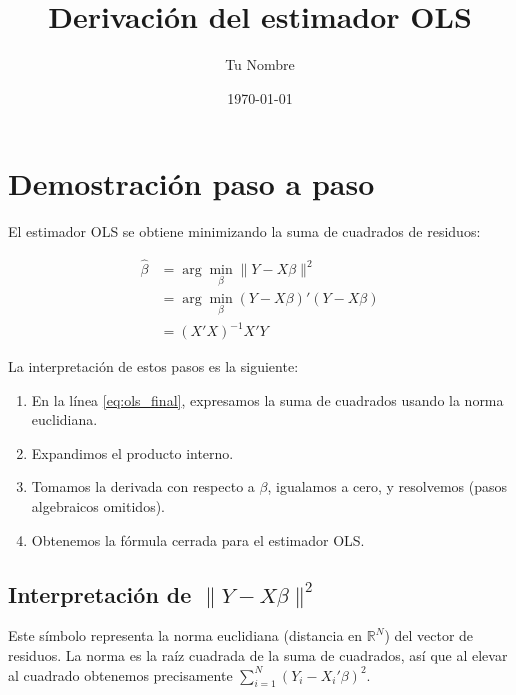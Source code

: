 \documentclass[12pt, a4paper]{article}
\title{Derivación del estimador OLS}
\author{Tu Nombre}
\date{\today}
\begin{document}
\maketitle

\section{Demostración paso a paso}

El estimador OLS se obtiene minimizando la suma de cuadrados de residuos:

\begin{align}
  \hat{\beta} &= \arg\min_{\beta} \| Y - X\beta \|^2 \\
              &= \arg\min_{\beta} (Y - X\beta)'(Y - X\beta) \nonumber \\
              &= (X'X)^{-1}X'Y \label{eq:ols_final}
\end{align}

La interpretación de estos pasos es la siguiente:

\begin{enumerate}
  \item En la línea \eqref{eq:ols_final}, expresamos la suma de cuadrados usando 
        la norma euclidiana.
  \item Expandimos el producto interno.
  \item Tomamos la derivada con respecto a $\beta$, igualamos a cero, y resolvemos 
        (pasos algebraicos omitidos).
  \item Obtenemos la fórmula cerrada para el estimador OLS.
\end{enumerate}

\subsection*{Interpretación de $\|Y - X\beta\|^2$}

Este símbolo representa la norma euclidiana (distancia en $\mathbb{R}^N$) del 
vector de residuos. La norma es la raíz cuadrada de la suma de cuadrados, así 
que al elevar al cuadrado obtenemos precisamente $\sum_{i=1}^N (Y_i - X_i'\beta)^2$.
\end{document}
